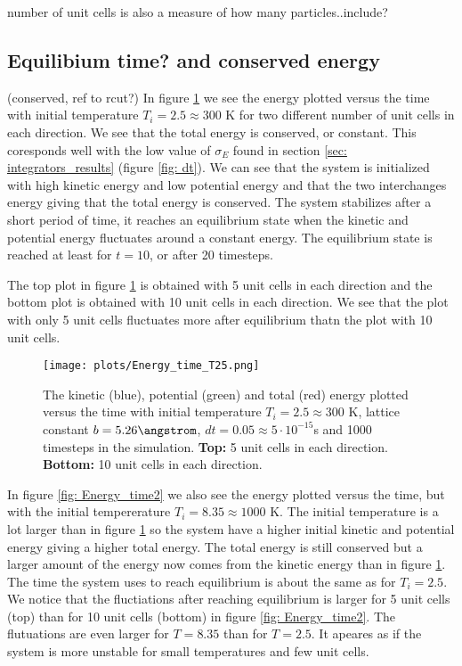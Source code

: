 \documentclass[11pt,a4wide]{article}
\begin{document}
number of unit cells is also a measure of how many particles..include?


\subsection{Equilibium time? and conserved energy}
(conserved, ref to rcut?)
In figure \ref{fig: Energy_time1} we see the energy plotted versus the time with initial temperature $T_i = 2.5 \approx 300$ K for two different number of unit cells in each direction. We see that the total energy is conserved, or constant. This coresponds well with the low value of $\sigma_E$ found in section \ref{sec: integrators_results} (figure \ref{fig: dt}). We can see that the system is initialized with high kinetic energy and low potential energy and that the two interchanges energy giving that the total energy is conserved. The system stabilizes after a short period of time, it reaches an equilibrium state when the kinetic and potential energy fluctuates around a constant energy. The equilibrium state is reached at least for $t=10$, or after 20 timesteps. 

The top plot in figure \ref{fig: Energy_time1} is obtained with 5 unit cells in each direction and the bottom plot is obtained with 10 unit cells in each direction. We see that the plot with only 5 unit cells fluctuates more after equilibrium thatn the plot with 10 unit cells. 

\begin{figure}[htp]
\centering
\texttt{[image: plots/Energy\_time\_T25.png]}
\caption{The kinetic (blue), potential (green) and total (red) energy plotted versus the time with initial temperature $T_i = 2.5 \approx 300$ K, lattice constant $b=5.26 \angstrom$, $dt=0.05\approx  5\cdot 10^{-15}$s and 1000 timesteps in the simulation. \textbf{Top:} 5 unit cells in each direction. \textbf{Bottom:} 10 unit cells in each direction.}
\label{fig: Energy_time1}
\end{figure}

In figure \ref{fig: Energy_time2} we also see the energy plotted versus the time, but with the initial tempererature $T_i = 8.35 \approx 1000$ K. The initial temperature is a lot larger than in figure \ref{fig: Energy_time1} so the system have a higher initial kinetic and potential energy giving a higher total energy. The total energy is still conserved but a larger amount of the energy now comes from the kinetic energy than in figure \ref{fig: Energy_time1}. The time the system uses to reach equilibrium is about the same as for $T_i=2.5$. We notice that the fluctiations after reaching equilibrium is larger for 5 unit cells (top) than for 10 unit cells (bottom) in figure \ref{fig: Energy_time2}. The flutuations are even larger for $T=8.35$ than for $T=2.5$. It apeares as if the system is more unstable for small temperatures and few unit cells. 
\end{document}
